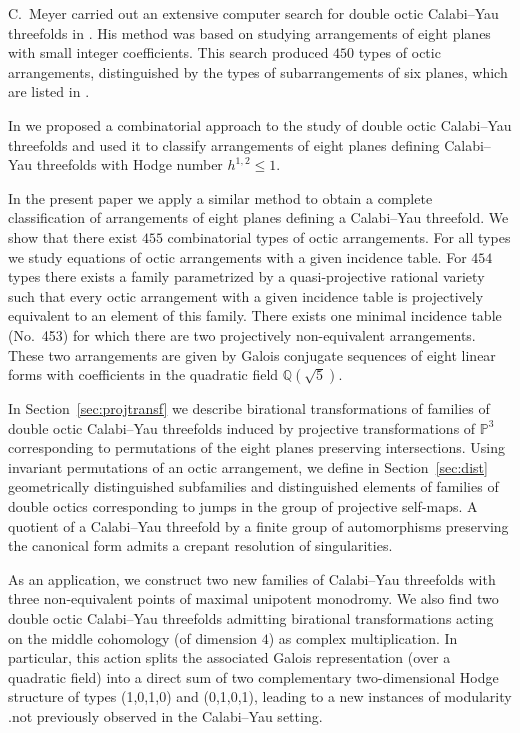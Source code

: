 \documentclass[12pt]{amsart}
\theoremstyle{plain}
\theoremstyle{remark}
\theoremstyle{definition}
\newcommand{\PP}{\mathbb P}
\newcommand\QQ{{\mathbb Q}}
\numberwithin{table}{section}
\begin{document}
C.~Meyer carried out an extensive computer search for double octic
Calabi--Yau threefolds in \cite{Meyer}. His method was based on studying
arrangements of eight planes with small integer coefficients. This
search produced $450$ types of octic arrangements, distinguished by the
types of subarrangements of six planes, which are listed in
\cite[App.~A]{Meyer}.



In \cite{CK-C} we proposed a combinatorial approach to the study of
double octic Calabi--Yau threefolds and used it to classify arrangements
of eight planes defining Calabi--Yau threefolds with Hodge number
$h^{1,2} \le 1$.

In the present paper we apply a similar method to obtain a complete
classification of arrangements of eight planes defining a
Calabi--Yau threefold. We show that there exist $455$ combinatorial
types of octic arrangements. For all types we study equations of octic
arrangements with a given incidence table. For $454$ types there exists
a family parametrized by a quasi-projective rational variety such that
every octic arrangement with a given incidence table is projectively
equivalent to an element of this family. There exists one minimal
incidence table (No.~453) for which there are two projectively
non-equivalent arrangements. These two arrangements are given by Galois
conjugate sequences of eight linear forms with coefficients in the
quadratic field $\QQ(\sqrt{5})$.


In Section~\ref{sec:projtransf} we describe birational transformations of families of
double octic Calabi--Yau threefolds induced by projective
transformations of $\PP^3$ corresponding to permutations of the eight
planes preserving intersections. Using invariant permutations of an
octic arrangement, we define in Section~\ref{sec:dist} geometrically distinguished
subfamilies and distinguished elements of families of double octics
corresponding to jumps in the group of projective self-maps. A quotient
of a Calabi--Yau threefold by a finite group of automorphisms preserving
the canonical form admits a crepant resolution of singularities.

As an application, we construct two new families of Calabi--Yau
threefolds with three non-equivalent points of maximal unipotent
monodromy. We also find two double octic Calabi--Yau threefolds admitting
birational transformations acting on the middle cohomology (of
dimension $4$) as complex multiplication. In particular, this action
splits the associated Galois representation (over a quadratic field)
into a direct sum of two complementary two-dimensional Hodge structure of types (1,0,1,0) and (0,1,0,1), leading to a new instances of modularity .not previously observed in the Calabi--Yau setting.
\end{document}
